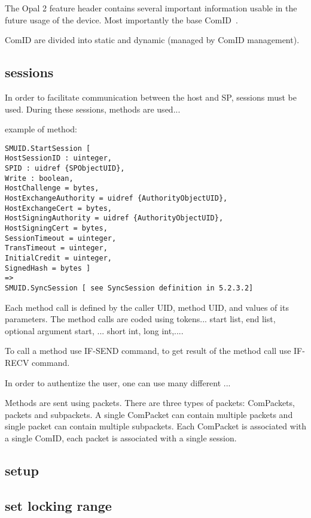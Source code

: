 \documentclass[
  digital, %
  oneside, %
  nolof,     %
  nolot,     %
]{fithesis4}
\begin{document}
The Opal 2 feature header contains several important information usable in the future usage of the device. Most importantly the base ComID~\cite[3.3.2]{tcg-storage-core}. 

ComID are divided into static and dynamic (managed by ComID management).

\subsection{sessions}

In order to facilitate communication between the host and SP, sessions must be used. During these sessions, methods are used...

example of method: 

\begin{lstlisting}
SMUID.StartSession [
HostSessionID : uinteger,
SPID : uidref {SPObjectUID},
Write : boolean,
HostChallenge = bytes,
HostExchangeAuthority = uidref {AuthorityObjectUID},
HostExchangeCert = bytes,
HostSigningAuthority = uidref {AuthorityObjectUID},
HostSigningCert = bytes,
SessionTimeout = uinteger,
TransTimeout = uinteger,
InitialCredit = uinteger,
SignedHash = bytes ]
=>
SMUID.SyncSession [ see SyncSession definition in 5.2.3.2]
\end{lstlisting}

Each method call is defined by the caller UID, method UID, and values of its parameters.
The method calls are coded using tokens... start list, end list, optional argument start, ... short int, long int,....

To call a method use IF-SEND command, to get result of the method call use IF-RECV command.

In order to authentize the user, one can use many different ...



Methods are sent using packets. There are three types of packets: ComPackets, packets and subpackets. A single ComPacket can contain multiple packets and single packet can contain multiple subpackets. Each ComPacket is associated with a single ComID, each packet is associated with a single session.



\subsection{setup}
\subsection{set locking range}
\end{document}
